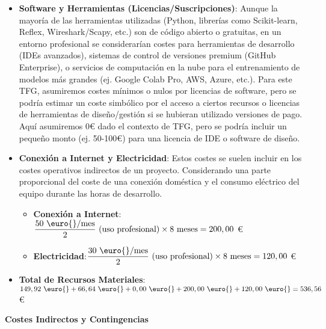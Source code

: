 \begin{itemize}
    \item\textbf{Software y Herramientas (Licencias/Suscripciones)}:
    Aunque la mayoría de las herramientas utilizadas (Python, librerías como Scikit-learn, Reflex, Wireshark/Scapy, etc.) son de código abierto o gratuitas, en un entorno profesional se considerarían costes para herramientas de desarrollo (IDEs avanzados), sistemas de control de versiones premium (GitHub Enterprise), o servicios de computación en la nube para el entrenamiento de modelos más grandes (ej. Google Colab Pro, AWS, Azure, etc.). Para este TFG, asumiremos costes mínimos o nulos por licencias de software, pero se podría estimar un coste simbólico por el acceso a ciertos recursos o licencias de herramientas de diseño/gestión si se hubieran utilizado versiones de pago. Aquí asumiremos 0€ dado el contexto de TFG, pero se podría incluir un pequeño monto (ej. 50-100€) para una licencia de IDE o software de diseño.
    
    \item\textbf{Conexión a Internet y Electricidad}:
    Estos costes se suelen incluir en los costes operativos indirectos de un proyecto. Considerando una parte proporcional del coste de una conexión doméstica y el consumo eléctrico del equipo durante las horas de desarrollo.
    
        \begin{itemize}
        
            \item\textbf{Conexión a Internet}:$\displaystyle \frac{50 \text{ \euro{}/mes}}{2} \text{ (uso profesional)} \times 8 \text{ meses} = 200,00 $ \euro{}
            
            \item\textbf{Electricidad}:$\displaystyle \frac{30 \text{ \euro{}/mes}}{2} \text{ (uso profesional)} \times 8 \text{ meses} = 120,00 $ \euro{}
                    
        \end{itemize}    
    
    \item\textbf{Total de Recursos Materiales}:$\displaystyle 149,92 \text{ \euro{}} + 66,64 \text{ \euro{}} + 0,00 \text{ \euro{}} + 200,00 \text{ \euro{}} + 120,00 \text{ \euro{}} = 536,56 $ \euro{}
   
\end{itemize}

\textbf{Costes Indirectos y Contingencias} 

